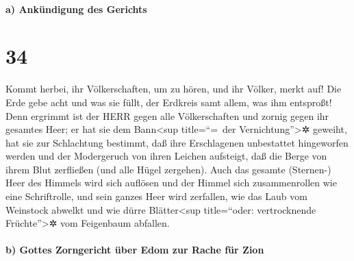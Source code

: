 \hypertarget{a-ankuxfcndigung-des-gerichts}{%
\paragraph{a) Ankündigung des
Gerichts}\label{a-ankuxfcndigung-des-gerichts}}

\hypertarget{section-33}{%
\section{34}\label{section-33}}

Kommt herbei, ihr Völkerschaften, um zu hören, und ihr
Völker, merkt auf! Die Erde gebe acht und was sie füllt, der Erdkreis
samt allem, was ihm entsproßt! Denn ergrimmt ist der HERR
gegen alle Völkerschaften und zornig gegen ihr gesamtes Heer; er hat sie
dem Bann\textless sup title=``=~der Vernichtung''\textgreater✲ geweiht,
hat sie zur Schlachtung bestimmt, daß ihre Erschlagenen
unbestattet hingeworfen werden und der Modergeruch von ihren Leichen
aufsteigt, daß die Berge von ihrem Blut zerfließen (und alle Hügel
zergehen). Auch das gesamte (Sternen-) Heer des Himmels
wird sich auflösen und der Himmel sich zusammenrollen wie eine
Schriftrolle, und sein ganzes Heer wird zerfallen, wie das Laub vom
Weinstock abwelkt und wie dürre Blätter\textless sup title=``oder:
vertrocknende Früchte''\textgreater✲ vom Feigenbaum abfallen.

\hypertarget{b-gottes-zorngericht-uxfcber-edom-zur-rache-fuxfcr-zion}{%
\paragraph{b) Gottes Zorngericht über Edom zur Rache für
Zion}\label{b-gottes-zorngericht-uxfcber-edom-zur-rache-fuxfcr-zion}}

